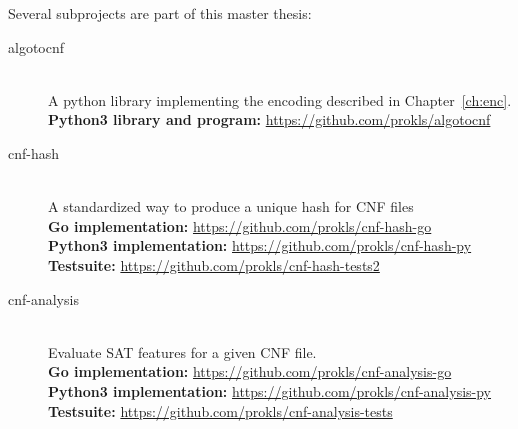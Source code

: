 Several subprojects are part of this master thesis:
\begin{description}
\item[algotocnf]\hfill{} \\
  A python library implementing the encoding described in Chapter~\ref{ch:enc}. \\[4pt]
  \textbf{Python3 library and program:} \url{https://github.com/prokls/algotocnf}
\item[cnf-hash]\hfill{} \\
  A standardized way to produce a unique hash for CNF files \\[4pt]
  \textbf{Go implementation:} \url{https://github.com/prokls/cnf-hash-go} \\
  \textbf{Python3 implementation:} \url{https://github.com/prokls/cnf-hash-py} \\
  \textbf{Testsuite:} \url{https://github.com/prokls/cnf-hash-tests2}
\item[cnf-analysis]\hfill{} \\
  Evaluate SAT features for a given CNF file. \\[4pt]
  \textbf{Go implementation:} \url{https://github.com/prokls/cnf-analysis-go} \\
  \textbf{Python3 implementation:} \url{https://github.com/prokls/cnf-analysis-py} \\
  \textbf{Testsuite:} \url{https://github.com/prokls/cnf-analysis-tests}
\end{description}
